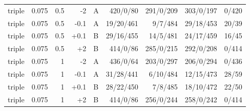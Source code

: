 \begin{longtable}{@{}lrrrlrrrr@{}}
triple & 0.075 & 0.5 & -2 & A & 420/0/80 & 291/0/209 & 303/0/197 & 0/420\\
triple & 0.075 & 0.5 & -0.1 & A & 19/20/461 & 9/7/484 & 29/18/453 & 20/39\\
triple & 0.075 & 0.5 & +0.1 & B & 29/16/455 & 14/5/481 & 24/17/459 & 16/45\\
triple & 0.075 & 0.5 & +2 & B & 414/0/86 & 285/0/215 & 292/0/208 & 0/414\\
triple & 0.075 & 1 & -2 & A & 436/0/64 & 203/0/297 & 206/0/294 & 0/436\\
triple & 0.075 & 1 & -0.1 & A & 31/28/441 & 6/10/484 & 12/15/473 & 28/59\\
triple & 0.075 & 1 & +0.1 & B & 28/22/450 & 7/8/485 & 18/10/472 & 22/50\\
triple & 0.075 & 1 & +2 & B & 414/0/86 & 256/0/244 & 258/0/242 & 0/414\\
\bottomrule
\end{longtable}
